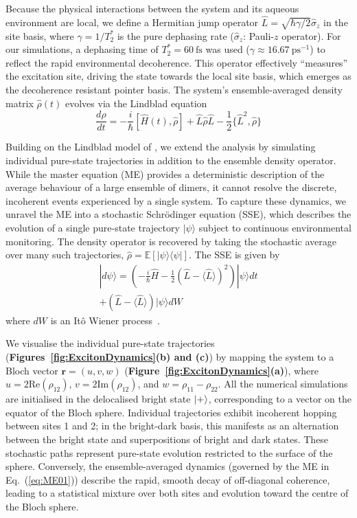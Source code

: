 \documentclass[journal=jpclcd, manuscript=letter, layout=twocolumn, doi=true]{achemso}
\begin{document}
Because the physical interactions between the system and its aqueous environment are local, we define a Hermitian jump operator $\hat{L} = \sqrt{\hbar \gamma / 2} \hat{\sigma}_z$ in the site basis, where $\gamma = 1/T_2^*$ is the pure dephasing rate ($\hat{\sigma}_z$: Pauli-$z$ operator). For our simulations, a dephasing time of $T_2^* = 60~\mathrm{fs}$ was used ($\gamma \approx 16.67~\mathrm{ps^{-1}}$) to reflect the rapid environmental decoherence. This operator effectively ``measures'' the excitation site, driving the state towards the local site basis, which emerges as the decoherence resistant pointer basis. The system's ensemble-averaged density matrix $\hat{\rho}(t)$ evolves via the Lindblad equation \cite{manzano2020short}
\begin{equation}
    \frac{d\hat{\rho}}{dt}=-\frac{i}{\hbar}[\hat H(t),\hat\rho] + \hat{L} \hat\rho \hat{L} - \frac{1}{2} \{\hat{L}^2, \hat\rho\}
    \label{eq:ME01}
\end{equation}

Building on the Lindblad model of \cite{abrahams2025excitonic}, we extend the analysis by simulating individual pure-state trajectories in addition to the ensemble density operator. While the master equation (ME) provides a deterministic description of the average behaviour of a large ensemble of dimers, it cannot resolve the discrete, incoherent events experienced by a single system. To capture these dynamics, we unravel the ME into a stochastic Schrödinger equation (SSE), which describes the evolution of a single pure-state trajectory $|\psi\rangle$ subject to continuous environmental monitoring. The density operator is recovered by taking the stochastic average over many such trajectories, $\hat{\rho} = \mathbb{E}[|\psi\rangle\langle\psi|]$. The SSE is given by
\begin{multline}
    |d\psi\rangle = \left( -\frac{i}{\hbar}\hat{H} - \frac{1}{2}(\hat{L} - \langle \hat{L} \rangle)^2 \right) |\psi\rangle dt \\
    + (\hat{L} - \langle \hat{L} \rangle) |\psi\rangle dW
\end{multline}
where $dW$ is an It\^{o} Wiener process~\cite{petruccione}.

We visualise the individual pure-state trajectories (\textbf{Figures~\ref{fig:ExcitonDynamics}(b) and (c)}) by mapping the system to a Bloch vector $\mathbf{r} = (u, v, w)$ (\textbf{Figure~\ref{fig:ExcitonDynamics}(a)}), where $u = 2\text{Re}(\rho_{12})$, $v = 2\text{Im}(\rho_{12})$, and $w = \rho_{11} - \rho_{22}$. All the numerical simulations are initialised in the delocalised bright state $\ket{+}$, corresponding to a vector on the equator of the Bloch sphere. Individual trajectories exhibit incoherent hopping between sites 1 and 2; in the bright-dark basis, this manifests as an alternation between the bright state and superpositions of bright and dark states. These stochastic paths represent pure-state evolution restricted to the surface of the sphere. Conversely, the ensemble-averaged dynamics (governed by the ME in Eq.~(\ref{eq:ME01})) describe the rapid, smooth decay of off-diagonal coherence, leading to a statistical mixture over both sites and evolution toward the centre of the Bloch sphere.
\end{document}

